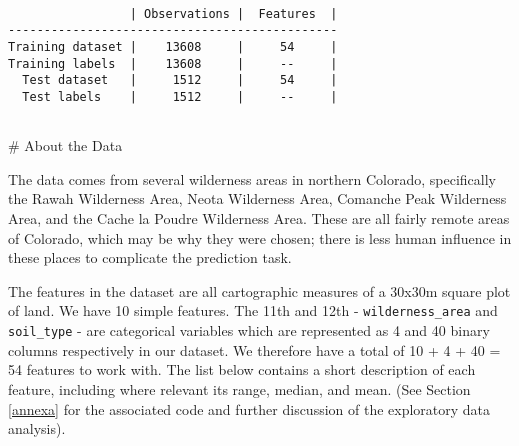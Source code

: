 \documentclass[11pt]{article}
\begin{document}
    \begin{Verbatim}[commandchars=\\\{\}]

                 | Observations |  Features  |
----------------------------------------------
Training dataset |    13608     |     54     |
Training labels  |    13608     |     --     |
  Test dataset   |     1512     |     54     |
  Test labels    |     1512     |     --     |


    \end{Verbatim}

    

     \# About the Data

    The data comes from several wilderness areas in northern Colorado,
specifically the Rawah Wilderness Area, Neota Wilderness Area, Comanche
Peak Wilderness Area, and the Cache la Poudre Wilderness Area. These are
all fairly remote areas of Colorado, which may be why they were chosen;
there is less human influence in these places to complicate the
prediction task.

The features in the dataset are all cartographic measures of a 30x30m
square plot of land. We have 10 simple features. The 11th and 12th -
\texttt{wilderness\_area} and \texttt{soil\_type} - are categorical
variables which are represented as 4 and 40 binary columns respectively
in our dataset. We therefore have a total of 10 + 4 + 40 = 54 features
to work with. The list below contains a short description of each
feature, including where relevant its range, median, and mean. (See
Section \ref{annexa} for the associated code and further discussion of
the exploratory data analysis).
\end{document}
